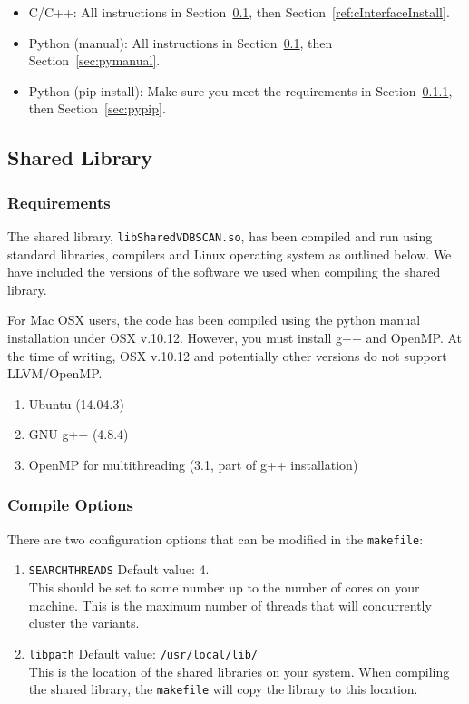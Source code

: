 \documentclass[12pt]{article}
\begin{document}
\begin{itemize}
\item C/C++: All instructions in Section~\ref{sec:sharedlib}, then Section~\ref{ref:cInterfaceInstall}.
\item Python (manual): All instructions in Section~\ref{sec:sharedlib}, then Section~\ref{sec:pymanual}.
\item Python (pip install): Make sure you meet the requirements in Section~\ref{sec:sharedlib_req}, then Section~\ref{sec:pypip}.
\end{itemize}

\subsection{Shared Library}\label{sec:sharedlib}
\subsubsection{Requirements}\label{sec:sharedlib_req}
The shared library, \texttt{libSharedVDBSCAN.so}, has been compiled and run using standard libraries, compilers and Linux operating system as outlined below.  We have included the versions of the software we used when compiling the shared library.  

For Mac OSX users, the code has been compiled using the python manual installation under OSX v.10.12. However, you must install g++ and OpenMP. At the time of writing, OSX v.10.12 and potentially other versions do not support LLVM/OpenMP.
\begin{enumerate}
\item Ubuntu (14.04.3)
\item GNU g++ (4.8.4)
\item OpenMP for multithreading (3.1, part of g++ installation)
\end{enumerate}

\subsubsection{Compile Options}\label{sec:sharedlib_compileopt}
There are two configuration options that can be modified in the \verb|makefile|:
\begin{enumerate}
\item \verb|SEARCHTHREADS| Default value: 4. \\This should be set to some number up to the number of cores on your machine.  This is the maximum number of threads that will concurrently cluster the variants.
\item \verb|libpath| Default value: \verb|/usr/local/lib/| \\This is the location of the shared libraries on your system. When compiling the shared library, the \verb|makefile| will copy the library to this location.
\end{enumerate}
\end{document}
